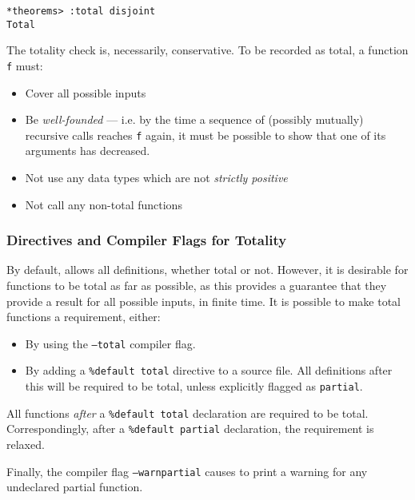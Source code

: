 \begin{lstlisting}[style=stdout]
*theorems> :total disjoint
Total
\end{lstlisting} 

\noindent
The totality check is, necessarily, conservative.
To be recorded as total, a function \texttt{f} must:

\begin{itemize}
\item Cover all possible inputs
\item Be \emph{well-founded} --- i.e. by the time a sequence of  (possibly mutually) recursive calls reaches \texttt{f} again, it must be possible to show that one of its arguments has decreased.
\item Not use any data types which are not \emph{strictly positive}
\item Not call any non-total functions
\end{itemize}

\subsubsection{Directives and Compiler Flags for Totality}

By default, \Idris{} allows all definitions, whether total or not.
However, it is desirable for functions to be total as far as possible, as this provides a guarantee that they provide a result for all possible inputs, in finite time. It is possible to make total functions a requirement, either:

\begin{itemize}
\item By using the \texttt{--total} compiler flag.
\item By adding a \texttt{\%default total} directive to a source file.
All definitions after this will be required to be total, unless explicitly flagged as \texttt{partial}.
\end{itemize}

\noindent
All functions \emph{after} a \texttt{\%default total} declaration are required to be total.
Correspondingly, after a \texttt{\%default partial} declaration, the requirement is relaxed.

Finally, the compiler flag \texttt{--warnpartial} causes \Idris{} to print a warning for any undeclared partial function.

